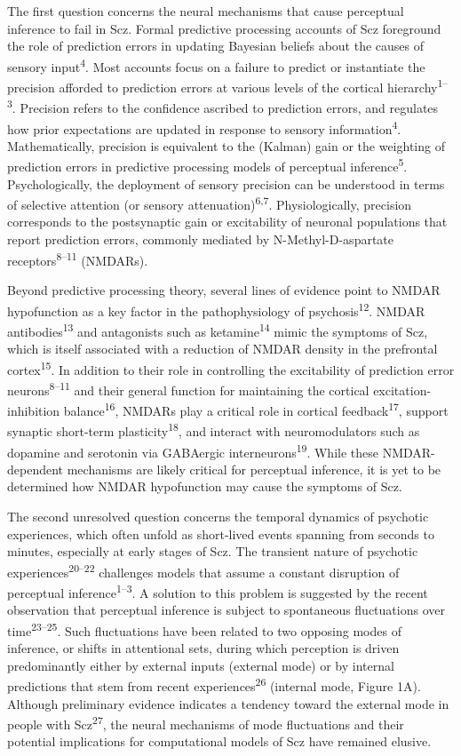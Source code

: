 \documentclass[
]{article}
\begin{document}
The first question concerns the neural mechanisms that cause perceptual
inference to fail in Scz. Formal predictive processing accounts of Scz
foreground the role of prediction errors in updating Bayesian beliefs
about the causes of sensory input\textsuperscript{4}. Most accounts
focus on a failure to predict or instantiate the precision afforded to
prediction errors at various levels of the cortical
hierarchy\textsuperscript{1--3}. Precision refers to the confidence
ascribed to prediction errors, and regulates how prior expectations are
updated in response to sensory information\textsuperscript{4}.
Mathematically, precision is equivalent to the (Kalman) gain or the
weighting of prediction errors in predictive processing models of
perceptual inference\textsuperscript{5}. Psychologically, the deployment
of sensory precision can be understood in terms of selective attention
(or sensory attenuation)\textsuperscript{6,7}. Physiologically,
precision corresponds to the postsynaptic gain or excitability of
neuronal populations that report prediction errors, commonly mediated by
N-Methyl-D-aspartate receptors\textsuperscript{8--11} (NMDARs).

Beyond predictive processing theory, several lines of evidence point to
NMDAR hypofunction as a key factor in the pathophysiology of
psychosis\textsuperscript{12}. NMDAR antibodies\textsuperscript{13} and
antagonists such as ketamine\textsuperscript{14} mimic the symptoms of
Scz, which is itself associated with a reduction of NMDAR density in the
prefrontal cortex\textsuperscript{15}. In addition to their role in
controlling the excitability of prediction error
neurons\textsuperscript{8--11} and their general function for
maintaining the cortical excitation-inhibition
balance\textsuperscript{16}, NMDARs play a critical role in cortical
feedback\textsuperscript{17}, support synaptic short-term
plasticity\textsuperscript{18}, and interact with neuromodulators such
as dopamine and serotonin via GABAergic
interneurons\textsuperscript{19}. While these NMDAR-dependent mechanisms
are likely critical for perceptual inference, it is yet to be determined
how NMDAR hypofunction may cause the symptoms of Scz.

The second unresolved question concerns the temporal dynamics of
psychotic experiences, which often unfold as short-lived events spanning
from seconds to minutes, especially at early stages of Scz. The
transient nature of psychotic experiences\textsuperscript{20--22}
challenges models that assume a constant disruption of perceptual
inference\textsuperscript{1--3}. A solution to this problem is suggested
by the recent observation that perceptual inference is subject to
spontaneous fluctuations over time\textsuperscript{23--25}. Such
fluctuations have been related to two opposing modes of inference, or
shifts in attentional sets, during which perception is driven
predominantly either by external inputs (external mode) or by internal
predictions that stem from recent experiences\textsuperscript{26}
(internal mode, Figure 1A). Although preliminary evidence indicates a
tendency toward the external mode in people with
Scz\textsuperscript{27}, the neural mechanisms of mode fluctuations and
their potential implications for computational models of Scz have
remained elusive.
\end{document}
